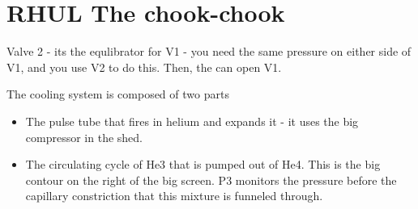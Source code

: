 \section{RHUL The chook-chook}
\begin{framed}\noindent
  Valve 2 - its the equlibrator for  V1 - you need the same pressure on
  either side of V1, and you use V2 to do this.  Then, the can open V1.
\end{framed}
\begin{framed}\noindent
  The cooling system is composed of two parts
  \begin{itemize}
  \item The pulse  tube that fires in  helium and expands it  - it uses
    the big compressor in the shed.
  \item The circulating cycle of He3 that is pumped out of He4. This is
    the big  contour on the  right of the  big screen. P3  monitors the
    pressure  before the  capillary constriction  that this  mixture is
    funneled through.
  \end{itemize}
\end{framed}

